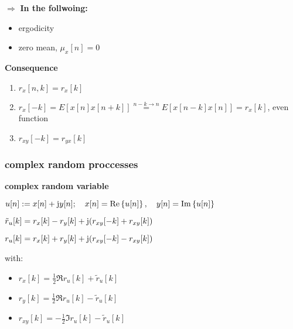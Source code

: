 $\Rightarrow$ \textbf{In the follwoing:} 
\begin{itemize}
\item ergodicity
\item zero mean, $\mu_x[n]=0$
\end{itemize} 

\textbf{Consequence}
\begin{enumerate}
\item $r_x[n,k]=r_x[k]$
\item $r_x[-k]=E[x[n]x[n+k]]\overset{n-k\to n}{=}E[x[n-k]x[n]]=r_x[k]$, \quad even function
\item $r_{xy}[-k]=r_{yx}[k]$
\end{enumerate}


\subsubsection{complex random proccesses}
\textbf{complex random variable}

\quad$u[n]:=x[n]+\mathrm{j} y[n]; \quad x[n]=\operatorname{Re}\left\{u[n]\right\}, \quad y[n]=\operatorname{Im}\left\{u[n]\right\}$


\quad $\tilde{r}_u[k]=r_x[k]-r_y[k]+\mathrm{j} (r_{xy}[-k]+r_{xy}[k])$

\quad ${r}_u[k]=r_x[k]+r_y[k]+\mathrm{j} (r_{xy}[-k]-r_{xy}[k])$

\quad with: 
\begin{itemize}
\item $r_x[k]=\frac{1}{2}\Re{r_u[k]+\tilde{r}_u[k]}$
\item $r_y[k]=\frac{1}{2}\Re{r_u[k]-\tilde{r}_u[k]}$
\item $r_{xy}[k]=-\frac{1}{2}\Im{r_u[k]-\tilde{r}_u[k]}$
\end{itemize}


